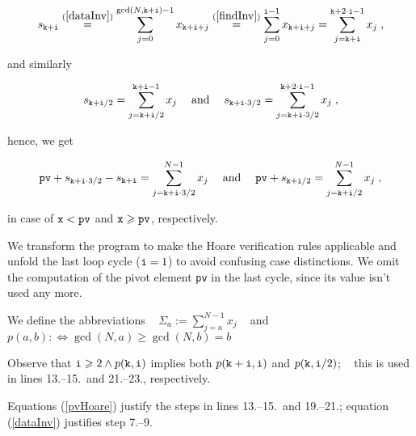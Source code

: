 \documentclass{elsartNoFoot}
\newcommand{\1}{\color{red}}
\newcommand{\2}{\color{green}}
\newcommand{\X}[1]{x_{#1}}		\renewcommand{\S}[1]{s_{#1}}
\newcommand{\+}[3]{{\renewcommand{\i}{{#1}}{#3},\ldots,\renewcommand{\i}{{#2}}{#3}}}
\newcommand{\ti}{{\tt i}}		\newcommand{\tk}{{\tt k}}
\renewcommand{\exp}[1]{\gcd(N,#1)}
\newcommand{\rf}[2]{\stackrel{(\ref{#1})}{#2}}
\newcommand{\SUM}[1]{\Sigma_{#1}}
\begin{document}
\begin{displaymath}
\S{\tk+\ti} 
\rf{dataInv}= \sum_{j=0}^{\exp{\tk + \ti}-1} \X{\tk + \ti + j}
\rf{findInv}= \sum_{j=0}^{\ti - 1} \X{\tk + \ti + j}
= \sum_{j=\tk+\ti}^{\tk + 2 \cdot \ti - 1} \X{j} \; ,
\end{displaymath}

and similarly

\begin{displaymath}
	\S{\tk+\ti / 2} = \sum_{j=\tk+\ti / 2}^{\tk + \ti - 1} \X{j} 
		\; \mbox{ ~ and ~ } \;
	\S{\tk+\ti \cdot 3 / 2} 
		= \sum_{j=\tk+\ti \cdot 3 / 2}^{\tk + 2 \cdot \ti - 1}
		\X{j}
		\; ,
\end{displaymath}

hence, we get

\begin{equation}
	{\tt pv} + \S{\tk+\ti \cdot 3 / 2} - \S{\tk+\ti}
	= \sum_{j=\tk+\ti \cdot 3 / 2}^{N-1} \X{j}
	\; \mbox{ ~ and ~ } \;
	{\tt pv} + \S{\tk+\ti / 2}
	= \sum_{j=\tk+\ti / 2}^{N-1} \X{j} \; ,
	\label{pvHoare}
\end{equation}

in case of ${\tt x} < {\tt pv}$ and ${\tt x} \geq {\tt pv}$,
respectively.

We transform the program to make the Hoare verification rules
applicable and unfold the last loop cycle ($\ti = 1$) to avoid
confusing case distinctions.
We omit the computation of the pivot element
{\tt pv} in the last cycle, since its value
isn't used any more.

We define the abbreviations
~
$\SUM{a} := \sum_{j=a}^{N-1} \X{j}$
~
and
~
$p(a,b) :\Leftrightarrow \exp{a} \geq \exp{b} = b$

Observe that 
$\ti \geq 2 \wedge p(\tk,\ti)$
implies both $p(\tk+\ti,\ti)$ and $p(\tk,\ti/2)$;
~
this is used in lines 13.--15.\ and 21.--23., respectively.

Equations (\ref{pvHoare}) justify the steps in lines 13.--15.\ and
19.--21.;
equation (\ref{dataInv}) justifies step 7.--9.
\end{document}
